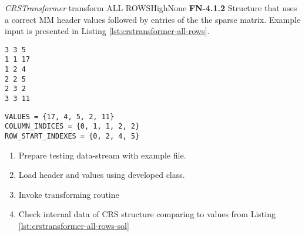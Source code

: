 \begin{testcase}{\emph{CRSTransformer} transform ALL ROWS}{High}{None}
		{
			\textbf{FN-4.1.2}
		}
		{
			Structure that uses a correct \gls{MM} header values followed by entries of the the sparse matrix. Example input is presented in Listing \ref{lst:crstransformer-all-rows}. 	
		}
		\begin{lstlisting}[label={lst:crstransformer-all-rows},
			    basicstyle=\small,caption={\gls{MM} format data example}, frame=single]
%%MatrixMarket matrix coordinate real general
3 3 5
1 1 17
1 2 4
2 2 5
2 3 2
3 3 11
		\end{lstlisting}
		\begin{lstlisting}[label={lst:crstransformer-all-rows-sol},
		basicstyle=\small,caption={\gls{CRS} format internal data example}, frame=single]
VALUES = {17, 4, 5, 2, 11}
COLUMN_INDICES = {0, 1, 1, 2, 2}
ROW_START_INDEXES = {0, 2, 4, 5}
		\end{lstlisting}
		{
			\begin{enumerate}
				\item Prepare testing data-stream with example file.
				\item Load header and values using developed class.
				\item Invoke transforming routine 
				\item
				{
					Check internal data of \gls{CRS} structure comparing to values from Listing \ref{lst:crstransformer-all-rows-sol} 
				}
			\end{enumerate}
		}
	\end{testcase}


